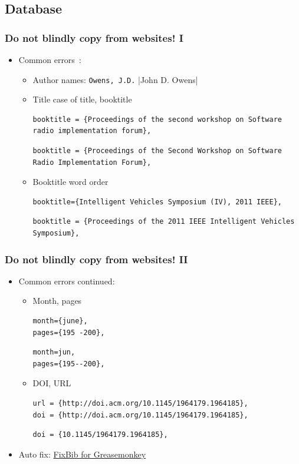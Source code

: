 \documentclass[CJKchecksingle]{beamer}
\begin{document}
\subsection{Database}
\begin{frame}[fragile]
  \frametitle{Do not blindly copy from websites! I}

  \begin{itemize}
    \item Common errors~\cite{biberrors}:
      \begin{itemize}
        \item<1->
          Author names: \lstinline[style=wrong]|Owens, J.D.|
          |John D. Owens|
        \item<2->
          Title case of title, booktitle
\begin{lstlisting}[style=wrong]
booktitle = {Proceedings of the second workshop on Software radio implementation forum},
\end{lstlisting}
\begin{lstlisting}
booktitle = {Proceedings of the Second Workshop on Software Radio Implementation Forum},
\end{lstlisting}%
        \item<3->
          Booktitle word order
\begin{lstlisting}[style=wrong]
booktitle={Intelligent Vehicles Symposium (IV), 2011 IEEE},
\end{lstlisting}
\begin{lstlisting}
booktitle = {Proceedings of the 2011 IEEE Intelligent Vehicles Symposium},
\end{lstlisting}
\end{itemize}
\end{itemize}
\end{frame}
\begin{frame}[fragile]
  \frametitle{Do not blindly copy from websites! II}
  \begin{itemize}
    \item Common errors continued:
      \begin{itemize}
        \item
          Month, pages
\begin{lstlisting}[style=wrong]
month={june},
pages={195 -200},
\end{lstlisting}
\begin{lstlisting}
month=jun,
pages={195--200},
\end{lstlisting}
\pause
        \item
          DOI, URL
\begin{lstlisting}[style=wrong]
url = {http://doi.acm.org/10.1145/1964179.1964185},
doi = {http://doi.acm.org/10.1145/1964179.1964185},
\end{lstlisting}
\begin{lstlisting}
doi = {10.1145/1964179.1964185},
\end{lstlisting}
      \end{itemize}
    \pause
    \item
      Auto fix: \href{https://github.com/alick9188/fixbib}{FixBib
      for Greasemonkey}
  \end{itemize}

\end{frame}
\end{document}
